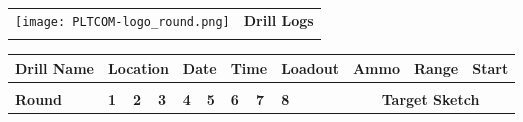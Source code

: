 \documentclass[../Cover.tex]{subfiles}
\begin{document}
\begin{minipage}[t][0.15\textheight][t]{\textwidth}
	\begin{tabular}{p{} p{}}
	\texttt{[image: PLTCOM-logo\_round.png]} & \textbf{Drill Logs} \\
	&\\[.5cm]
	\end{tabular}
\end{minipage}
\begin{minipage}[t][0.85\textheight][t]{\textwidth}
	\begin{tabular}{|l|l|l|l|l|l|l|l|l|l|l|l|l|l|l|l|l|l|l|l|}
		\hline
		\multicolumn{3}{|l|}{\cellcolor[HTML]{C0C0C0}\textbf{Drill Name}} & \multicolumn{3}{l|}{\cellcolor[HTML]{C0C0C0}\textbf{Location}}                                               & \multicolumn{2}{l|}{\cellcolor[HTML]{C0C0C0}\textbf{Date}}              & \multicolumn{2}{l|}{\cellcolor[HTML]{C0C0C0}\textbf{Time}}              & \multicolumn{3}{l|}{\cellcolor[HTML]{C0C0C0}\textbf{Loadout}} & \multicolumn{3}{l|}{\cellcolor[HTML]{C0C0C0}\textbf{Ammo}} & \multicolumn{2}{l|}{\cellcolor[HTML]{C0C0C0}\textbf{Range}} & \multicolumn{2}{l|}{\cellcolor[HTML]{C0C0C0}\textbf{Start}} \\ \hline
		\multicolumn{3}{|l|}{}                                            & \multicolumn{3}{l|}{}                                                                                        & \multicolumn{2}{l|}{}                                                   & \multicolumn{2}{l|}{}                                                   & \multicolumn{3}{l|}{}                                         & \multicolumn{3}{l|}{}                                      & \multicolumn{2}{l|}{}                                       & \multicolumn{2}{l|}{}                                       \\ \hline
		\multicolumn{3}{|l|}{\cellcolor[HTML]{C0C0C0}\textbf{Round}}      & \cellcolor[HTML]{C0C0C0}\textbf{1} & \cellcolor[HTML]{C0C0C0}\textbf{2} & \cellcolor[HTML]{C0C0C0}\textbf{3} & \cellcolor[HTML]{C0C0C0}\textbf{4} & \cellcolor[HTML]{C0C0C0}\textbf{5} & \cellcolor[HTML]{C0C0C0}\textbf{6} & \cellcolor[HTML]{C0C0C0}\textbf{7} & \cellcolor[HTML]{C0C0C0}\textbf{8}        &         & \multicolumn{8}{c|}{\cellcolor[HTML]{C0C0C0}\textbf{Target Sketch}}                                                                                                                              \\ \cline{1-11} \cline{13-20} 

\end{tabular}
\end{minipage}
\end{document}
